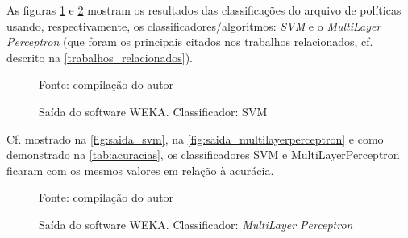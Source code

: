 As figuras \ref{fig:saida_svm} e \ref{fig:saida_multilayerperceptron} mostram os resultados das classificações do arquivo de políticas usando, respectivamente, os classificadores/algoritmos: \textit{SVM} e o \textit{MultiLayer Perceptron} (que foram os principais citados nos trabalhos relacionados, cf. descrito na \autoref{trabalhos_relacionados}).  %
\begin{figure}[H]
	\centering
	\caption{Saída do software WEKA. Classificador: SVM}

	\label{fig:saida_svm}
	{\scriptsize Fonte: compilação do autor}
\end{figure}

Cf. mostrado na \autoref{fig:saida_svm}, na \autoref{fig:saida_multilayerperceptron} e como demonstrado na \autoref{tab:acuracias}, os classificadores SVM e MultiLayerPerceptron ficaram com os mesmos valores em relação à acurácia.

\begin{figure}[H]
	\centering
	\caption{Saída do software WEKA. Classificador: \textit{MultiLayer Perceptron}}
 
	\label{fig:saida_multilayerperceptron}
	{\scriptsize Fonte: compilação do autor}
\end{figure}

